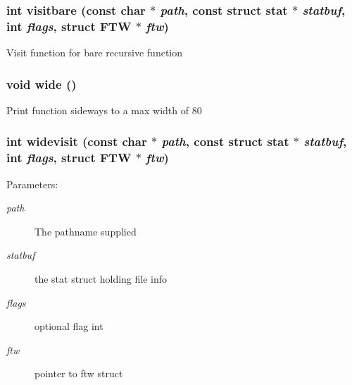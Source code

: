 \subsubsection{\setlength{\rightskip}{0pt plus 5cm}int visitbare (const char $\ast$ {\em path}, const struct stat $\ast$ {\em statbuf}, int {\em flags}, struct FTW $\ast$ {\em ftw})}\label{dir_8h_519d854245c038268702e9048802186f}


Visit function for bare recursive function 
\subsubsection{\setlength{\rightskip}{0pt plus 5cm}void wide ()}\label{dir_8h_296e4d798368b2136158a86aa0b74e4f}


Print function sideways to a max width of 80 
\subsubsection{\setlength{\rightskip}{0pt plus 5cm}int widevisit (const char $\ast$ {\em path}, const struct stat $\ast$ {\em statbuf}, int {\em flags}, struct FTW $\ast$ {\em ftw})}\label{dir_8h_3cd01b34455f6845ef6d047bd9810351}


\begin{Desc}
\item[Parameters:]
\begin{description}
\item[{\em path}]The pathname supplied \item[{\em statbuf}]the stat struct holding file info \item[{\em flags}]optional flag int \item[{\em ftw}]pointer to ftw struct \end{description}
\end{Desc}
